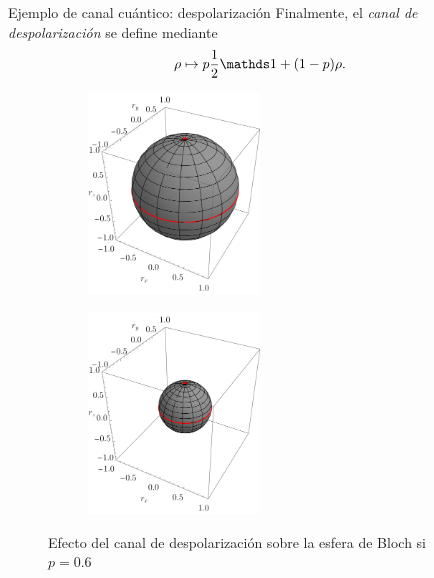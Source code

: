 \begin{frame}{Ejemplo de canal cuántico: despolarización}
    Finalmente, el \textit{canal de despolarización} se define mediante
    \begin{equation}
        \rho\mapsto p\frac{1}{2}\Id+(1-p)\rho\nonumber.
    \end{equation}
    \begin{figure}
        \centering
        \begin{subfigure}{0.45\textwidth}
            \centering
            \includegraphics[width=0.5\textwidth]{figures/whole_sphere.png}
        \end{subfigure}
        \begin{subfigure}{0.45\textwidth}
            \centering
            \includegraphics[width=0.5\textwidth]{figures/depol.png}
        \end{subfigure}
        \caption{Efecto del canal de despolarización sobre la esfera de Bloch si $p=0.6$}
    \end{figure}
\end{frame}

